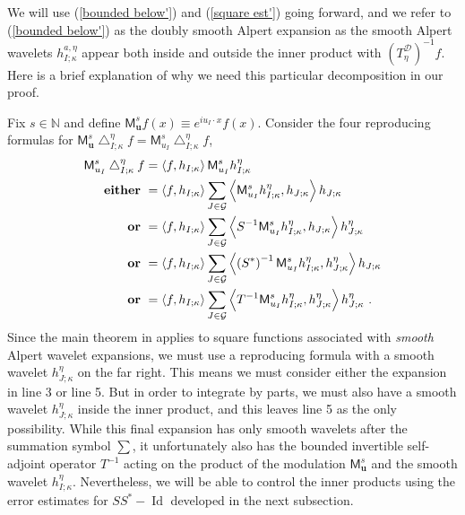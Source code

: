 \documentclass{amsart}%
\theoremstyle{plain}
\numberwithin{equation}{section}
\begin{document}
We will use (\ref{bounded below'}) and (\ref{square est'}) going forward, and
we refer to (\ref{bounded below'}) as the doubly smooth Alpert expansion as
the smooth Alpert wavelets $h_{I;\kappa}^{a,\eta}$ appear both inside and
outside the inner product with $\left(  T_{\eta}^{\mathcal{D}}\right)  ^{-1}%
f$. Here is a brief explanation of why we need this particular decomposition
in our proof.

Fix $s\in\mathbb{N}$ and define $\mathsf{M}_{\mathbf{u}}^{s}f\left(  x\right)
\equiv e^{iu_{I}\cdot x}f\left(  x\right)  $. Consider the four reproducing
formulas for $\mathsf{M}_{\mathbf{u}}^{s}\bigtriangleup_{I;\kappa}^{\eta
}f=\mathsf{M}_{u_{I}}^{s}\bigtriangleup_{I;\kappa}^{\eta}f$,%
\begin{align*}
\mathsf{M}_{u_{I}}^{s}\bigtriangleup_{I;\kappa}^{\eta}f  & =\left\langle
f,h_{I;\kappa}\right\rangle \mathsf{M}_{u_{I}}^{s}h_{I;\kappa}^{\eta}\\
\text{\textbf{either} }  & =\left\langle f,h_{I;\kappa}\right\rangle
\sum_{J\in\mathcal{G}}\left\langle \mathsf{M}_{u_{I}}^{s}h_{I;\kappa}^{\eta
},h_{J;\kappa}\right\rangle h_{J;\kappa}\\
\text{\textbf{or} }  & =\left\langle f,h_{I;\kappa}\right\rangle \sum
_{J\in\mathcal{G}}\left\langle S^{-1}\mathsf{M}_{u_{I}}^{s}h_{I;\kappa}^{\eta
},h_{J;\kappa}\right\rangle h_{J;\kappa}^{\eta}\\
\text{\textbf{or} }  & =\left\langle f,h_{I;\kappa}\right\rangle \sum
_{J\in\mathcal{G}}\left\langle \left(  S^{\ast}\right)  ^{-1}\mathsf{M}%
_{u_{I}}^{s}h_{I;\kappa}^{\eta},h_{J;\kappa}^{\eta}\right\rangle h_{J;\kappa
}\\
\text{\textbf{or} }  & =\left\langle f,h_{I;\kappa}\right\rangle \sum
_{J\in\mathcal{G}}\left\langle T^{-1}\mathsf{M}_{u_{I}}^{s}h_{I;\kappa}^{\eta
},h_{J;\kappa}^{\eta}\right\rangle h_{J;\kappa}^{\eta}\ .
\end{align*}
Since the main theorem in \cite[Theorem 5]{Saw7} applies to square functions
associated with \emph{smooth} Alpert wavelet expansions, we must use a
reproducing formula with a smooth wavelet $h_{J;\kappa}^{\eta}$ on the far
right. This means we must consider either the expansion in line 3 or line 5.
But in order to integrate by parts, we must also have a smooth wavelet
$h_{J;\kappa}^{\eta}$ inside the inner product, and this leaves line 5 as the
only possibility. While this final expansion has only smooth wavelets after
the summation symbol $\sum$, it unfortunately also has the bounded invertible
self-adjoint operator $T^{-1}$ acting on the product of the modulation
$\mathsf{M}_{\mathbf{u}}^{s}$ and the smooth wavelet $h_{I;\kappa}^{\eta}$.
Nevertheless, we will be able to control the inner products using the error
estimates for $SS^{\ast}-\operatorname*{Id}$ developed in the next subsection.
\end{document}
